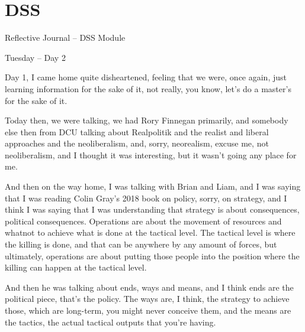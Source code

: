 \chapter{DSS}

Reflective Journal – DSS Module

Tuesday – Day 2

Day 1, I came home quite disheartened, feeling that we were, once again, just learning information for the sake of it, not really, you know, let’s do a master’s for the sake of it.

Today then, we were talking, we had Rory Finnegan primarily, and somebody else then from DCU talking about Realpolitik and the realist and liberal approaches and the neoliberalism, and, sorry, neorealism, excuse me, not neoliberalism, and I thought it was interesting, but it wasn’t going any place for me.

And then on the way home, I was talking with Brian and Liam, and I was saying that I was reading Colin Gray’s 2018 book on policy, sorry, on strategy, and I think I was saying that I was understanding that strategy is about consequences, political consequences. Operations are about the movement of resources and whatnot to achieve what is done at the tactical level. The tactical level is where the killing is done, and that can be anywhere by any amount of forces, but ultimately, operations are about putting those people into the position where the killing can happen at the tactical level.

And then he was talking about ends, ways and means, and I think ends are the political piece, that’s the policy. The ways are, I think, the strategy to achieve those, which are long-term, you might never conceive them, and the means are the tactics, the actual tactical outputs that you’re having.


